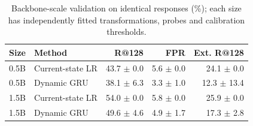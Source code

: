 \begin{table}[t]
\centering\footnotesize
\caption{Backbone-scale validation on identical responses (\%); each size has independently fitted transformations, probes and calibration thresholds.}\label{tab:scale}
\begin{tabular}{llrrr}\toprule
Size & Method & R@128 & FPR & Ext. R@128 \\
\midrule
0.5B & Current-state LR & 43.7 $\pm$ 0.0 & 5.6 $\pm$ 0.0 & 24.1 $\pm$ 0.0 \\
0.5B & Dynamic GRU & 38.1 $\pm$ 6.3 & 3.3 $\pm$ 1.0 & 12.3 $\pm$ 13.4 \\
1.5B & Current-state LR & 54.0 $\pm$ 0.0 & 5.8 $\pm$ 0.0 & 25.9 $\pm$ 0.0 \\
1.5B & Dynamic GRU & 49.6 $\pm$ 4.6 & 4.9 $\pm$ 1.7 & 17.3 $\pm$ 2.8 \\
\bottomrule\end{tabular}
\end{table}
